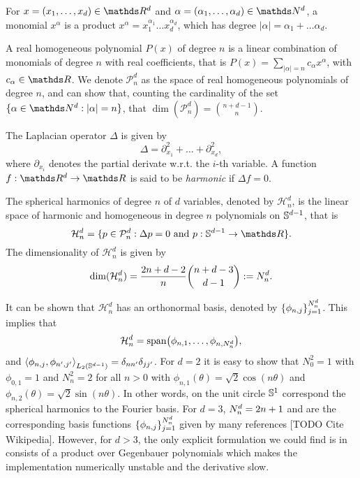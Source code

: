 For $x = (x_1, \ldots, x_d) \in \Reals^d$ and $\alpha = (\alpha_1, \ldots, \alpha_d) \in \Naturals^d$, a monomial $x^\alpha$ is a product $x^\alpha = x_1^{\alpha_1} \ldots x_d^{\alpha_d}$, which has degree $|\alpha| = \alpha_1 + \ldots \alpha_d$.

A real homogeneous polynomial $P(x)$ of degree $n$ is a linear combination of monomials of degree $n$ with real coefficients, that is $P(x) = \sum_{|\alpha| = n} c_{\alpha} x^{\alpha}$, with $c_\alpha \in \Reals$. We denote $\mathcal{P}_n^d$ as the space of real homogeneous polynomials of degree $n$, and can show that, counting the cardinality of the set $\{\alpha \in \Naturals^d: |\alpha| = n\}$, that $\dim(\mathcal{P}_n^d) = \binom{n + d -1}{n}$.

The Laplacian operator $\Delta$ is given by
\begin{equation}
    \Delta = \partial_{x_1}^2 + \ldots + \partial_{x_d}^2,
\end{equation}
where $\partial_{x_i}$ denotes the partial derivate w.r.t. the $i$-th variable. A function $f:\Reals^d \rightarrow \Reals$ is said to be \emph{harmonic} if $\Delta f = 0$.

\begin{definition}
    The spherical harmonics of degree $n$ of $d$ variables, denoted by $\mathcal{H}_{n}^d$, is the linear space of harmonic and homogeneous in degree $n$ polynomials on $\mathbb{S}^{d-1}$, that is 
    \begin{equation}
        \mathcal{H}_{n}^d = \{p \in \mathcal{P}_n^d: \Delta p = 0\ \text{and}\ p: \dsphere \rightarrow \Reals \}.
    \end{equation}
The dimensionality of $ \mathcal{H}_{n}^d$ is given by
\begin{equation}
\label{eq:numharmonics}
\textrm{dim}(\mathcal{H}_{n}^d) = \frac{2 n + d - 2}{n} \binom{n + d - 3}{d - 1} := N^d_n.
\end{equation}
\end{definition}

It can be shown that $\mathcal{H}_{n}^d$ has an orthonormal basis, denoted by $\{\phi_{n,j}\}_{j=1}^{N^d_n}$. This implies that
\begin{equation}
    \mathcal{H}_{n}^d  = \textrm{span}\left(\phi_{n,1}, \ldots, \phi_{n, \dnumharmonicsforlevel}\right),
\end{equation}
and $\left\langle \phi_{n, j}, \phi_{n', j'}\right\rangle_{L_2(\dsphere)} = \delta_{n n'} \delta_{j j'}$. For $d=2$ it is easy to show that $N^{2}_0 = 1$ with $\phi_{0, 1} = 1$ and $N^{2}_n = 2$ for all $n > 0$ with $\phi_{n, 1}(\theta) = \sqrt{2} \cos(n \theta)$ and $\phi_{n, 2}(\theta) = \sqrt{2} \sin(n \theta)$. In other words, on the unit circle $\mathbb{S}^1$ correspond the spherical harmonics to the Fourier basis. For $d=3$, $N^d_n = 2n + 1$ and are the corresponding basis functions $\{\phi_{n,j}\}_{j=1}^{N^d_n}$ given by many references [TODO Cite Wikipedia]. However, for $d > 3$, the only explicit formulation we could find is in \citet[Theorem~5.1]{dai2013} consists of a product over Gegenbauer polynomials which makes the implementation numerically unstable and the derivative slow.


